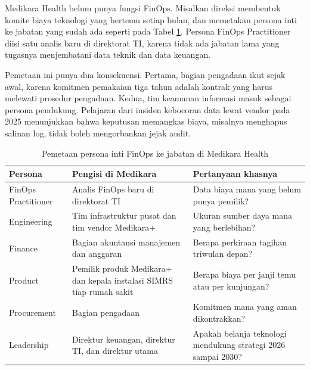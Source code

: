 \begin{kasus}[title={Kasus Medikara Health: Siapa Mengisi Persona Inti}]
  Medikara Health belum punya fungsi FinOps. Misalkan direksi membentuk komite biaya teknologi yang
  bertemu setiap bulan, dan memetakan persona inti ke jabatan yang sudah ada seperti pada Tabel
  \ref{tab:ch03-persona-medikara}. Persona FinOps Practitioner diisi satu analis baru di direktorat
  TI, karena tidak ada jabatan lama yang tugasnya menjembatani data teknik dan data keuangan.

  Pemetaan ini punya dua konsekuensi. Pertama, bagian pengadaan ikut sejak awal, karena komitmen
  pemakaian tiga tahun adalah kontrak yang harus melewati prosedur pengadaan. Kedua, tim keamanan
  informasi masuk sebagai persona pendukung. Pelajaran dari insiden kebocoran data lewat vendor pada
  2025 menunjukkan bahwa keputusan memangkas biaya, misalnya menghapus salinan log, tidak boleh
  mengorbankan jejak audit.
\end{kasus}

\begin{table}[!htb]
  \centering
  \caption{Pemetaan persona inti FinOps ke jabatan di Medikara Health}
  \label{tab:ch03-persona-medikara}
  \footnotesize
  \begin{tabularx}{\textwidth}{>{\raggedright\arraybackslash}p{2.6cm} >{\raggedright\arraybackslash}X >{\raggedright\arraybackslash}X}
    \hline
    \textbf{Persona} & \textbf{Pengisi di Medikara} & \textbf{Pertanyaan khasnya} \\ \hline
    FinOps Practitioner & Analis FinOps baru di direktorat TI & Data biaya mana yang belum punya
      pemilik? \\ \hline
    Engineering & Tim infrastruktur pusat dan tim vendor Medikara+ & Ukuran sumber daya mana yang
      berlebihan? \\ \hline
    Finance & Bagian akuntansi manajemen dan anggaran & Berapa perkiraan tagihan triwulan depan? \\
      \hline
    Product & Pemilik produk Medikara+ dan kepala instalasi SIMRS tiap rumah sakit & Berapa biaya
      per janji temu atau per kunjungan? \\ \hline
    Procurement & Bagian pengadaan & Komitmen mana yang aman dikontrakkan? \\ \hline
    Leadership & Direktur keuangan, direktur TI, dan direktur utama & Apakah belanja teknologi
      mendukung strategi 2026 sampai 2030? \\ \hline
  \end{tabularx}
\end{table}

